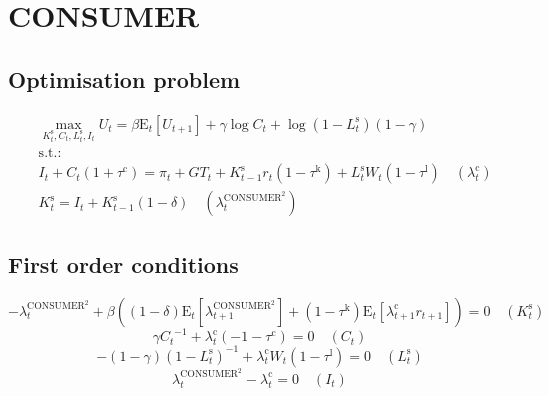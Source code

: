 

\section{CONSUMER}

\subsection{Optimisation problem}

\begin{align}
&\max_{K^{\mathrm{s}}_{t}, C_{t}, L^{\mathrm{s}}_{t}, I_{t}
} U_{t} = {\beta} {\mathrm{E}_{t}\left[U_{t+1}\right]} + {\gamma} {\log{C_{t}}} + {\log\left(1 - L^{\mathrm{s}}_{t}\right)} \left(1 - \gamma\right)\\
&\mathrm{s.t.:}\nonumber\\
& I_{t} + {C_{t}} \left(1 + \tau^{\mathrm{c}}\right) = \pi_{t} + {G\!T}_{t} + {K^{\mathrm{s}}_{t-1}} {r_{t}} \left(1 - \tau^{\mathrm{k}}\right) + {L^{\mathrm{s}}_{t}} {W_{t}} \left(1 - \tau^{\mathrm{l}}\right) \quad \left(\lambda^{\mathrm{c}}_{t}\right)\\
& K^{\mathrm{s}}_{t} = I_{t} + {K^{\mathrm{s}}_{t-1}} \left(1 - \delta\right) \quad \left(\lambda^{\mathrm{CONSUMER}^{\mathrm{2}}}_{t}\right)
\end{align}


\subsection{First order conditions}

\begin{equation}
-\lambda^{\mathrm{CONSUMER}^{\mathrm{2}}}_{t} + {\beta} \left(\left(1 - \delta\right) {\mathrm{E}_{t}\left[\lambda^{\mathrm{CONSUMER}^{\mathrm{2}}}_{t+1}\right]} + \left(1 - \tau^{\mathrm{k}}\right) {\mathrm{E}_{t}\left[{\lambda^{\mathrm{c}}_{t+1}} {r_{t+1}}\right]}\right) = 0
 \quad \left(K^{\mathrm{s}}_{t}\right)
\end{equation}
\begin{equation}
{\gamma} {C_{t}}^{-1} + {\lambda^{\mathrm{c}}_{t}} \left(-1 - \tau^{\mathrm{c}}\right) = 0
 \quad \left(C_{t}\right)
\end{equation}
\begin{equation}
-\left(1 - \gamma\right) \left(1 - L^{\mathrm{s}}_{t}\right)^{-1} + {\lambda^{\mathrm{c}}_{t}} {W_{t}} \left(1 - \tau^{\mathrm{l}}\right) = 0
 \quad \left(L^{\mathrm{s}}_{t}\right)
\end{equation}
\begin{equation}
\lambda^{\mathrm{CONSUMER}^{\mathrm{2}}}_{t} - \lambda^{\mathrm{c}}_{t} = 0
 \quad \left(I_{t}\right)
\end{equation}




